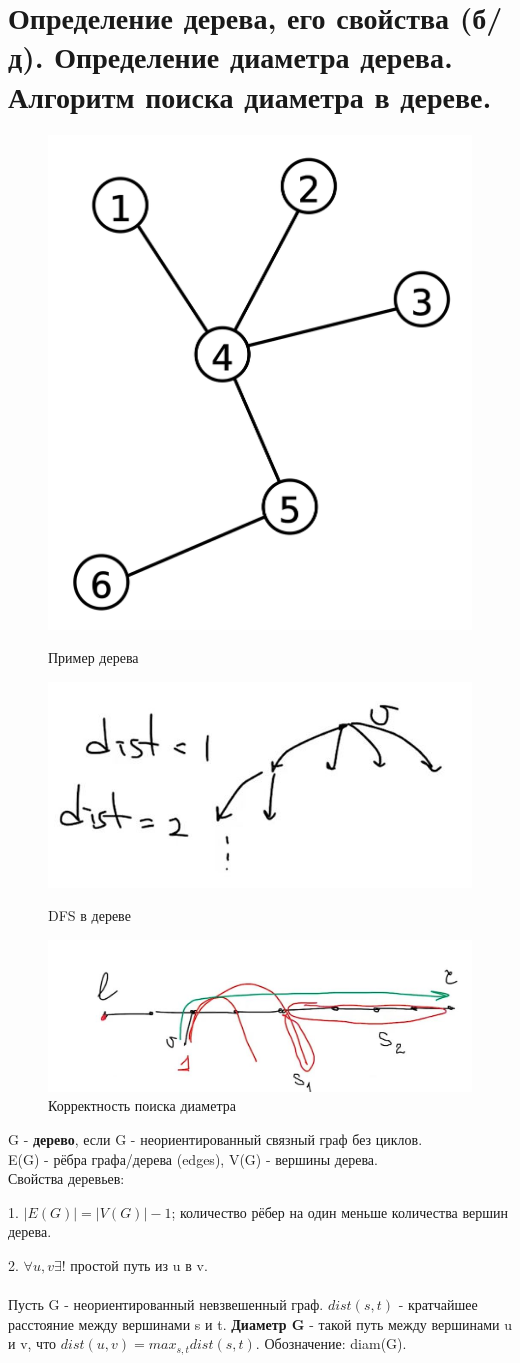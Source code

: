 \setcounter{section}{92}
\section{Определение дерева, его свойства (б/д). Определение диаметра дерева. Алгоритм поиска диаметра в дереве.}

\begin{figure}[!htb]
   \begin{minipage}{.3301\textwidth}
     \centering
     \includegraphics[height = 2 cm]{images/93-94_tree2}
     \caption{Пример дерева}
   \end{minipage}\hfill
   \begin{minipage}{.3301\textwidth}
     \centering
     \includegraphics[height = 2 cm]{images/93-94_dfs_tree}
     \caption{DFS в дереве}
   \end{minipage}
    \begin{minipage}{.331\textwidth}
     \centering
     \includegraphics[height = 2 cm]{images/93-94_correct}
     \caption{Корректность поиска диаметра}
   \end{minipage}
\end{figure}

G - \textbf{дерево}, если G - неориентированный связный граф без циклов.\\
E(G) - рёбра графа/дерева (edges), V(G) - вершины дерева. \\
Свойства деревьев:

1. $|E(G)| = |V(G)| - 1$; количество рёбер на один меньше количества вершин дерева.

2. $\forall u, v \exists!$ простой путь из u в v. \\
\\
Пусть G - неориентированный невзвешенный граф. $dist(s, t)$ - кратчайшее расстояние между вершинами s и t. \textbf{Диаметр G} - такой путь между вершинами u и v, что $dist(u, v) = max_{s, t} dist(s, t)$. Обозначение: diam(G).

